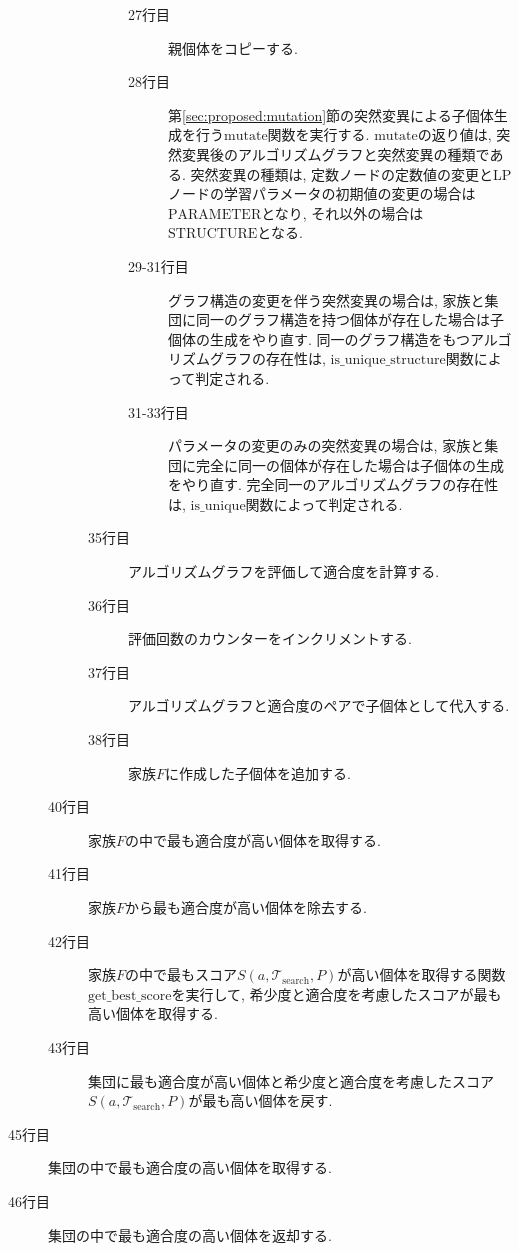 \documentclass[11pt,oneside,openany,report]{jsbook}
\begin{document}
\begin{description}
\begin{description}
\begin{description}
      \begin{description}
        \item[27行目] 親個体をコピーする.
        \item[28行目] 第\ref{sec:proposed:mutation}節の突然変異による子個体生成を行う$\mathrm{mutate}$関数を実行する. $\mathrm{mutate}$の返り値は, 突然変異後のアルゴリズムグラフと突然変異の種類である. 突然変異の種類は, 定数ノードの定数値の変更とLPノードの学習パラメータの初期値の変更の場合は$\mathrm{PARAMETER}$となり, それ以外の場合は$\mathrm{STRUCTURE}$となる.
        \item[29-31行目] グラフ構造の変更を伴う突然変異の場合は, 家族と集団に同一のグラフ構造を持つ個体が存在した場合は子個体の生成をやり直す. 同一のグラフ構造をもつアルゴリズムグラフの存在性は, $\mathrm{is\_unique\_structure}$関数によって判定される.
        \item[31-33行目] パラメータの変更のみの突然変異の場合は, 家族と集団に完全に同一の個体が存在した場合は子個体の生成をやり直す. 完全同一のアルゴリズムグラフの存在性は, $\mathrm{is\_unique}$関数によって判定される.
      \end{description}
      \item[35行目] アルゴリズムグラフを評価して適合度を計算する.
      \item[36行目] 評価回数のカウンターをインクリメントする.
      \item[37行目] アルゴリズムグラフと適合度のペアで子個体として代入する.
      \item[38行目] 家族$F$に作成した子個体を追加する.
    \end{description}
    \item[40行目] 家族$F$の中で最も適合度が高い個体を取得する.
    \item[41行目] 家族$F$から最も適合度が高い個体を除去する.
    \item[42行目] 家族$F$の中で最もスコア$S(a,\mathcal{T}_\mathrm{search}, P)$が高い個体を取得する関数$\mathrm{get\_best\_score}$を実行して, 希少度と適合度を考慮したスコアが最も高い個体を取得する.
    \item[43行目] 集団に最も適合度が高い個体と希少度と適合度を考慮したスコア$S(a,\mathcal{T}_\mathrm{search}, P)$が最も高い個体を戻す.
  \end{description}
  \item[45行目] 集団の中で最も適合度の高い個体を取得する.
  \item[46行目] 集団の中で最も適合度の高い個体を返却する.
\end{description}
\end{document}
